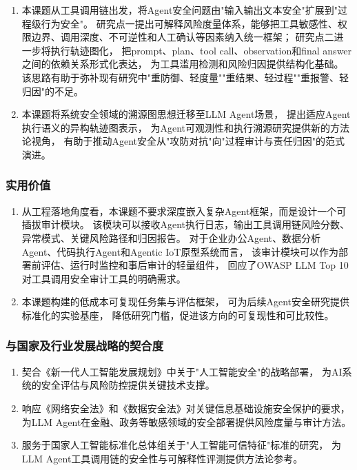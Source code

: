 \begin{enumerate}
  \item 本课题从工具调用链出发，将Agent安全问题由"输入输出文本安全"扩展到"过程级行为安全"。
  研究点一提出可解释风险度量体系，能够把工具敏感性、权限边界、调用深度、不可逆性和人工确认等因素纳入统一框架；
  研究点二进一步将执行轨迹图化，
  把prompt、plan、tool call、observation和final answer之间的依赖关系形式化表达，
  为工具滥用检测和风险归因提供结构化基础。
  该思路有助于弥补现有研究中"重防御、轻度量""重结果、轻过程""重报警、轻归因"的不足。

  \item 本课题将系统安全领域的溯源图思想\cite{inam2023sok,gao2021threatraptor,cheng2024kairos}迁移至LLM Agent场景，
  提出适应Agent执行语义的异构轨迹图表示，
  为Agent可观测性和执行溯源研究提供新的方法论视角，
  有助于推动Agent安全从"攻防对抗"向"过程审计与责任归因"的范式演进。
\end{enumerate}

\subsubsection{实用价值}

\begin{enumerate}
  \item 从工程落地角度看，本课题不要求深度嵌入复杂Agent框架，而是设计一个可插拔审计模块。
  该模块可以接收Agent执行日志，输出工具调用链风险分数、异常模式、关键风险路径和归因报告。
  对于企业办公Agent、数据分析Agent、代码执行Agent和Agentic IoT原型系统而言，
  该审计模块可以作为部署前评估、运行时监控和事后审计的轻量组件，
  回应了OWASP LLM Top 10\cite{owasp2025llmtop10}对工具调用安全审计工具的明确需求。

  \item 本课题构建的低成本可复现任务集与评估框架，
  可为后续Agent安全研究提供标准化的实验基座，
  降低研究门槛，促进该方向的可复现性和可比较性。
\end{enumerate}

\subsubsection{与国家及行业发展战略的契合度}

\begin{enumerate}
  \item 契合《新一代人工智能发展规划》中关于"人工智能安全"的战略部署，
  为AI系统的安全评估与风险防控提供关键技术支撑。
  \item 响应《网络安全法》和《数据安全法》对关键信息基础设施安全保护的要求，
  为LLM Agent在金融、政务等敏感领域的安全部署提供风险度量与审计方法。
  \item 服务于国家人工智能标准化总体组关于"人工智能可信特征"标准的研究，
  为LLM Agent工具调用链的安全性与可解释性评测提供方法论参考。
\end{enumerate}
